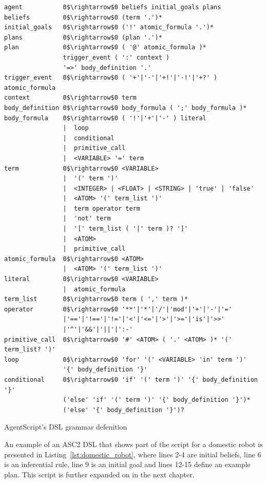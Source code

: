 \begin{listing} 
\begin{verbatim}
agent           0$\rightarrow$0 beliefs initial_goals plans
beliefs         0$\rightarrow$0 (term '.')*
initial_goals   0$\rightarrow$0 ('!' atomic_formula '.')*
plans           0$\rightarrow$0 (plan '.')*
plan            0$\rightarrow$0 ( '@' atomic_formula )*
                trigger_event ( ':' context )
                '=>' body_definition '.'
trigger_event   0$\rightarrow$0 ( '+'|'-'|'+!'|'-!'|'+?' ) atomic_formula
context         0$\rightarrow$0 term
body_definition 0$\rightarrow$0 body_formula ( ';' body_formula )*
body_formula    0$\rightarrow$0 ( '!'|'+'|'-' ) literal
                |  loop
                |  conditional
                |  primitive_call
                |  <VARIABLE> '=' term
term            0$\rightarrow$0 <VARIABLE>
                |  '(' term ')'
                |  <INTEGER> | <FLOAT> | <STRING> | 'true' | 'false' 
                |  <ATOM> '(' term_list ')'
                |  term operator term
                |  'not' term
                |  '[' term_list ( '|' term )? ']'
                |  <ATOM>
                |  primitive_call
atomic_formula  0$\rightarrow$0 <ATOM>
                |  <ATOM> '(' term_list ')'
literal         0$\rightarrow$0 <VARIABLE> 
                |  atomic_formula               
term_list       0$\rightarrow$0 term ( ',' term )*
operator        0$\rightarrow$0 '**'|'*'|'/'|'mod'|'+'|'-'|'='
                |'=='|'!=='|'!='|'<'|'<='|'>'|'>='|'is'|'>>'
                |'^'|'&&'|'||'|':-'
primitive_call  0$\rightarrow$0 '#' <ATOM> ( '.' <ATOM> )* '(' term_list? ')'
loop            0$\rightarrow$0 'for' '(' <VARIABLE> 'in' term ')' 
                '{' body_definition '}'
conditional     0$\rightarrow$0 'if' '(' term ')' '{' body_definition '}'
                ('else' 'if' '(' term ')' '{' body_definition '}')*
                ('else' '{' body_definition '}')?
\end{verbatim}
\caption{AgentScript's DSL grammar defenition}
\label{listings:asc2grammar}
\end{listing}%


An example of an ASC2 DSL that shows part of the script for a domestic robot is presented in Listing~\ref{lst:domestic_robot}, where lines 2-4 are initial beliefs, line 6 is an inferential rule, line 9 is an initial goal and lines 12-15 define an example plan. This script is further expanded on in the next chapter.

